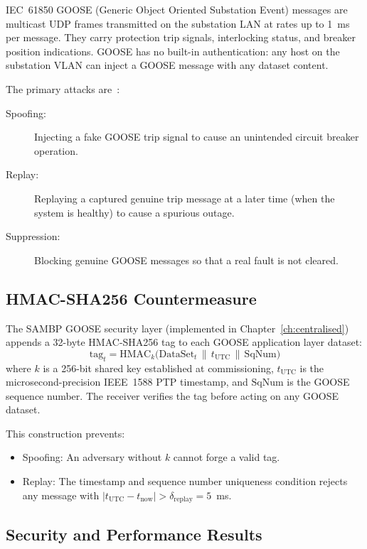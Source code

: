 IEC~61850 GOOSE (Generic Object Oriented Substation Event) messages are
multicast UDP frames transmitted on the substation LAN at rates up to
1~ms per message. They carry protection trip signals, interlocking status,
and breaker position indications. GOOSE has no built-in authentication:
any host on the substation VLAN can inject a GOOSE message with any
dataset content.

The primary attacks are~\citep{IEC62351}:
\begin{description}
\item[Spoofing:] Injecting a fake GOOSE trip signal to cause an
    unintended circuit breaker operation.
\item[Replay:] Replaying a captured genuine trip message at a later
    time (when the system is healthy) to cause a spurious outage.
\item[Suppression:] Blocking genuine GOOSE messages so that a real
    fault is not cleared.
\end{description}

\subsection{HMAC-SHA256 Countermeasure}

The SAMBP GOOSE security layer (implemented in Chapter~\ref{ch:centralised})
appends a 32-byte HMAC-SHA256 tag to each GOOSE application layer dataset:
\begin{equation}
  \mathrm{tag}_t = \mathrm{HMAC}_k\bigl(\mathrm{DataSet}_t \,\|\, t_\mathrm{UTC} \,\|\, \mathrm{SqNum}\bigr)
  \label{eq:ch12_hmac}
\end{equation}
where $k$ is a 256-bit shared key established at commissioning,
$t_\mathrm{UTC}$ is the microsecond-precision IEEE~1588 PTP timestamp,
and $\mathrm{SqNum}$ is the GOOSE sequence number. The receiver verifies
the tag before acting on any GOOSE dataset.

This construction prevents:
\begin{itemize}
\item Spoofing: An adversary without $k$ cannot forge a valid tag.
\item Replay: The timestamp and sequence number uniqueness condition
      rejects any message with $|t_\mathrm{UTC} - t_\mathrm{now}| > \delta_\mathrm{replay} = 5$~ms.
\end{itemize}

\subsection{Security and Performance Results}

